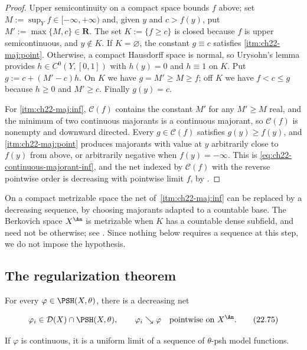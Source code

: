 \begin{proof}
Upper semicontinuity on a compact space bounds $f$ above; set
$M:=\sup_Yf\in[-\infty,+\infty)$ and, given $y$ and $c>f(y)$, put
$M':=\max\{M,c\}\in\mathbf R$.  The set $K:=\{f\geq c\}$ is closed
because $f$ is upper semicontinuous, and $y\notin K$.  If
$K=\varnothing$, the constant $g\equiv c$ satisfies
\cref{itm:ch22-maj:point}.  Otherwise, a compact Hausdorff space is normal,
so Urysohn's lemma provides $h\in C^0(Y,[0,1])$ with $h(y)=0$ and
$h\equiv1$ on $K$.  Put $g:=c+(M'-c)h$.  On $K$ we have
$g=M'\geq M\geq f$; off $K$ we have $f<c\leq g$ because $h\geq0$ and
$M'\geq c$.  Finally $g(y)=c$.

For \cref{itm:ch22-maj:inf}, $\mathcal C(f)$ contains the constant $M'$
for any $M'\geq M$ real, and the minimum of two continuous majorants is a
continuous majorant, so $\mathcal C(f)$ is nonempty and downward directed.
Every $g\in\mathcal C(f)$ satisfies $g(y)\geq f(y)$, and
\cref{itm:ch22-maj:point} produces majorants with value at $y$ arbitrarily
close to $f(y)$ from above, or arbitrarily negative when
$f(y)=-\infty$.  This is \eqref{eq:ch22-continuous-majorant-inf}, and the
net indexed by $\mathcal C(f)$ with the reverse pointwise order is
decreasing with pointwise limit $f$, by
.
\end{proof}

\begin{remark}
\label{rem:ch22-majorant-net-not-sequence}
On a compact metrizable space the net of
\,\cref{itm:ch22-maj:inf} can be replaced
by a decreasing sequence, by choosing majorants adapted to a countable base.
The Berkovich space $X^{\An}$ is metrizable when $K$ has a countable
dense subfield, and need not be otherwise; see
.  Since nothing below requires a
sequence at this step, we do not impose the hypothesis.
\end{remark}

\subsection{The regularization theorem}

\begin{theorem}\label{thm:bfj-decreasing-regularization}
For every $\varphi\in\PSH(X,\theta)$, there is a decreasing net

\[
              \varphi_i\in\mathcal D(X)\cap\PSH(X,\theta),
              \qquad
              \varphi_i\searrow\varphi
              \quad\text{pointwise on }X^{\An}.
\tag{22.75}\label{eq:ch22-decreasing-regularization}
\]

If $\varphi$ is continuous, it is a uniform limit of a sequence of
$\theta$-psh model functions.
\end{theorem}

